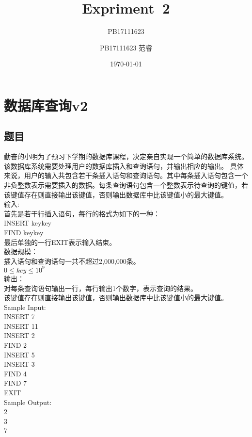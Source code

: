 \documentclass[UTF8]{ctexart}
\title{Expriment\ 2}
\author{PB17111623}
\author{PB17111623 范睿}
\date{\today}
\begin{document}
\maketitle
\section{数据库查询v2}
\subsection{题目}
勤奋的小明为了预习下学期的数据库课程，决定亲自实现一个简单的数据库系统。该数据库系统需要处理用户的数据库插入和查询语句，并输出相应的输出。
具体来说，用户的输入共包含若干条插入语句和查询语句。其中每条插入语句包含一个非负整数表示需要插入的数据。每条查询语句包含一个整数表示待查询的键值，若该键值存在则直接输出该键值，否则输出数据库中比该键值小的最大键值。\\

输入:\\
首先是若干行插入语句，每行的格式为如下的一种：\\
INSERT keykey\\
FIND keykey\\
最后单独的一行EXIT表示输入结束。\\

数据规模：\\
插入语句和查询语句一共不超过2,000,000条。\\
$0\leq key \leq 10^9$\\

输出：\\
对每条查询语句输出一行，每行输出1个数字，表示查询的结果。\\
该键值存在则直接输出该键值，否则输出数据库中比该键值小的最大键值。\\

Sample Input:\\ 
INSERT 7\\
INSERT 11\\
INSERT 2\\
FIND 2\\
INSERT 5\\
INSERT 3\\
FIND 4\\
FIND 7\\
EXIT\\

Sample Output:\\
2\\
3\\
7\\
\end{document}
